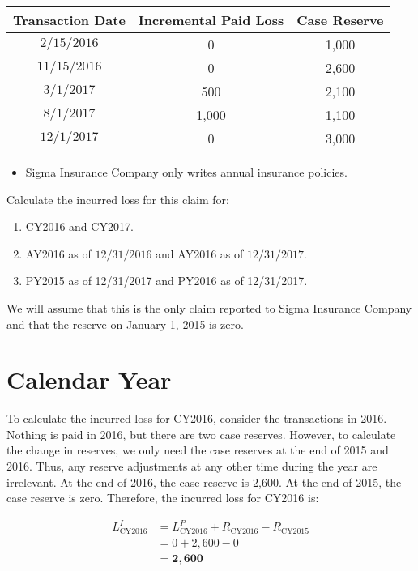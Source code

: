 \documentclass[10pt]{article}
\begin{document}
\begin{center}
\begin{tabular}{|c|c|c|}
\hline
Transaction Date & Incremental Paid Loss & Case Reserve \\
\hline
$2 / 15 / 2016$ & 0 & 1,000 \\
\hline
$11 / 15 / 2016$ & 0 & 2,600 \\
\hline
$3 / 1 / 2017$ & 500 & 2,100 \\
\hline
$8 / 1 / 2017$ & 1,000 & 1,100 \\
\hline
$12 / 1 / 2017$ & 0 & 3,000 \\
\hline
\end{tabular}
\end{center}

\begin{itemize}
  \item Sigma Insurance Company only writes annual insurance policies.
\end{itemize}

Calculate the incurred loss for this claim for:

\begin{enumerate}
  \item CY2016 and CY2017.

  \item AY2016 as of $12 / 31 / 2016$ and AY2016 as of $12 / 31 / 2017$.

  \item PY2015 as of 12/31/2017 and PY2016 as of 12/31/2017.

\end{enumerate}

We will assume that this is the only claim reported to Sigma Insurance Company and that the reserve on January 1, 2015 is zero.

\section{Calendar Year}
To calculate the incurred loss for CY2016, consider the transactions in 2016. Nothing is paid in 2016, but there are two case reserves. However, to calculate the change in reserves, we only need the case reserves at the end of 2015 and 2016. Thus, any reserve adjustments at any other time during the year are irrelevant. At the end of 2016, the case reserve is 2,600. At the end of 2015, the case reserve is zero. Therefore, the incurred loss for CY2016 is:

$$
\begin{aligned}
L_{\mathrm{CY} 2016}^{I} & =L_{\mathrm{CY} 2016}^{P}+R_{\mathrm{CY} 2016}-R_{\mathrm{CY} 2015} \\
& =0+2,600-0 \\
& =\mathbf{2 , 6 0 0}
\end{aligned}
$$
\end{document}
